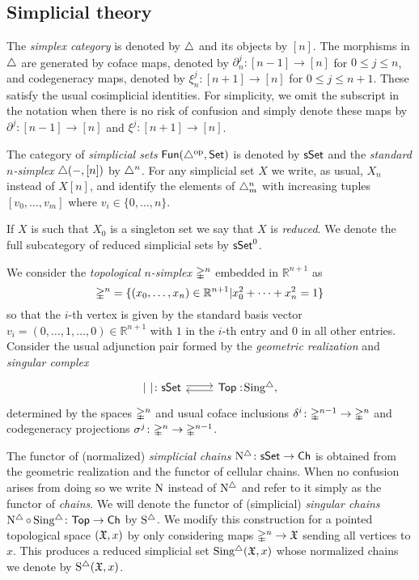 \subsection{Simplicial theory}\label{ss:simplicial}

The \textit{simplex category} is denoted by $\triangle$ and its objects by $[n]$. The morphisms in $\triangle$ are generated by coface maps, denoted by $\partial^{j}_n \colon [n-1] \to [n]$ for $0\leq j \leq n$, and codegeneracy maps, denoted by $\xi^{j}_n \colon [n+1] \to [n]$ for $0 \leq j \leq n+1$. These satisfy the usual cosimplicial identities. For simplicity, we omit the subscript in the notation when there is no risk of confusion and simply denote these maps by $\partial^{j} \colon [n-1] \to [n]$ and $\xi^{j} \colon [n+1] \to [n]$.

The category of \textit{simplicial sets} $\mathsf{Fun}(\triangle^{\mathrm{op}}, \mathsf{Set})$ is denoted by $\mathsf{sSet}$ and the \textit{standard $n$-simplex} $\triangle(-, [n])$ by $\triangle^n$.
For any simplicial set $X$ we write, as usual, $X_n$ instead of $X[n]$, and identify the elements of $\triangle^n_m$ with increasing tuples $[v_0, \dots, v_m]$ where $v_i \in \{0, \dots, n\}$.

If $X$ is such that $X_0$ is a singleton set we say that $X$ is \textit{reduced}.
We denote the full subcategory of reduced simplicial sets by $\mathsf{sSet}^0$.

We consider the \textit{topological $n$-simplex} $\mathbb{\Delta}^n$ embedded in $\mathbb{R}^{n+1}$ as
\[ \mathbb{\Delta}^n = \{ (x_0, \dots, x_n) \in \mathbb{R}^{n+1} | x_0^2 + \dots + x_n^2=1\} \]
so that the $i$-th vertex is given by the standard basis vector $v_i=(0,\ldots,1, \ldots,0) \in \mathbb{R}^{n+1}$ with $1$ in the $i$-th entry and $0$ in all other entries. Consider the usual adjunction pair formed by the \textit{geometric realization} and \textit{singular complex}
\[
\begin{tikzcd}
	\bars{\ } \colon \sSet \arrow[r, shift left=.5ex] &
	\Top :\! \sSing, \arrow[l, shift left=.5ex]
\end{tikzcd}
\]
determined by the spaces $\mathbb{\Delta}^n$ and usual coface inclusions $\delta^i \colon \mathbb{\Delta}^{n-1} \to \mathbb{\Delta}^n$ and codegeneracy projections $\sigma^j \colon \mathbb{\Delta}^n \to \mathbb{\Delta}^{n-1}$.

The functor of (normalized) \textit{simplicial chains} $\operatorname{N^{\triangle}} \colon \mathsf{sSet} \to \mathsf{Ch}$ is obtained from the geometric realization and the functor of cellular chains.
When no confusion arises from doing so we write $\operatorname{N}$ instead of $\operatorname{N^{\triangle}}$ and refer to it simply as the functor of \textit{chains}.
We will denote the functor of (simplicial) \textit{singular chains} $\operatorname{N^{\triangle}} \circ \operatorname{Sing^{\triangle}} \colon \mathsf{Top} \to \mathsf{Ch}$ by $\operatorname{S^{\triangle}}$.
We modify this construction for a pointed topological space $(\mathfrak{X},x)$ by only considering maps $\mathbb{\Delta}^n \to \mathfrak{X}$ sending all vertices to $x$.
This produces a reduced simplicial set $\operatorname{Sing^{\triangle}}(\mathfrak{X},x)$ whose normalized chains we denote by $\operatorname{S^{\triangle}}(\mathfrak{X},x)$.

